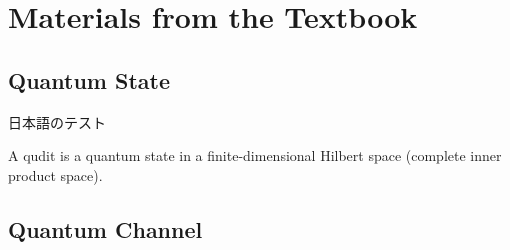 
\chapter{Materials from the Textbook}

\section{Quantum State}

日本語のテスト

\begin{definition}[Qudit]
    \label{dfn:qudit}
    \leanok
    A qudit is a quantum state in a finite-dimensional Hilbert space (complete inner product space).
\end{definition}

  

\section{Quantum Channel}

